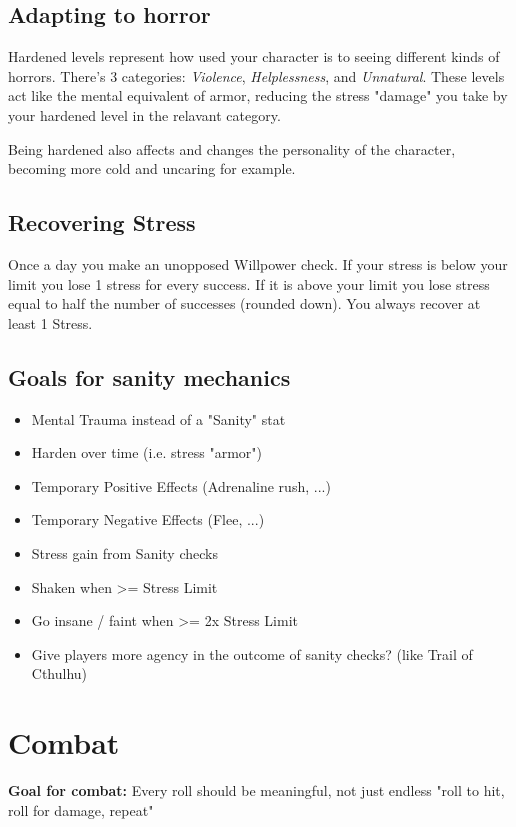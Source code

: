 \section{Adapting to horror}

Hardened levels represent how used your character is to seeing different kinds of horrors.
There's 3 categories: \textit{Violence}, \textit{Helplessness}, and \textit{Unnatural}.
These levels act like the mental equivalent of armor, reducing the stress "damage" 
you take by your hardened level in the relavant category.

Being hardened also affects and changes the personality of the character, becoming more cold and uncaring for example.


\section{Recovering Stress}
Once a day you make an unopposed Willpower check. 
If your stress is below your limit you lose 1 stress for every success. 
If it is above your limit you lose stress equal to half the number of successes (rounded down).
You always recover at least 1 Stress.

\section*{Goals for sanity mechanics}
\begin{itemize}
    \item Mental Trauma instead of a "Sanity" stat
    \item Harden over time (i.e. stress "armor")
    \item Temporary Positive Effects (Adrenaline rush, ...)
    \item Temporary Negative Effects (Flee, ...)
    \item Stress gain from Sanity checks
    \item Shaken when >= Stress Limit
    \item Go insane / faint when >= 2x Stress Limit
    \item Give players more agency in the outcome of sanity checks? (like Trail of Cthulhu)
\end{itemize}


\chapter{Combat}

\textbf{Goal for combat:} Every roll should be meaningful, not just endless "roll to hit, roll for damage, repeat" 

